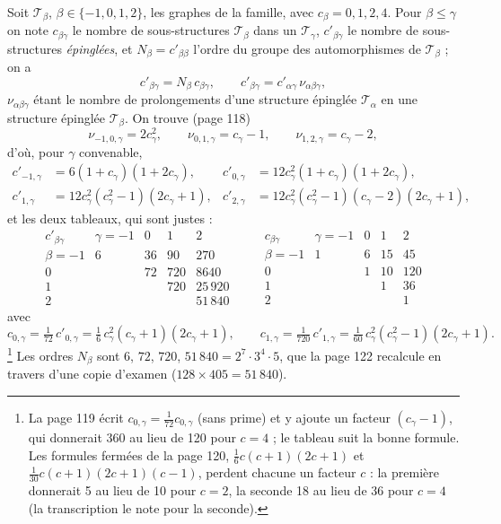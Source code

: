 \documentclass[11pt,a4paper]{article}
\begin{document}
Soit $\mathcal{T}_\beta$, $\beta \in \lbrace -1, 0, 1, 2\rbrace$, les graphes de la
famille, avec $c_\beta = 0, 1, 2, 4$. Pour $\beta \leq \gamma$ on note
$c_{\beta\gamma}$ le nombre de sous-structures $\mathcal{T}_\beta$ dans un
$\mathcal{T}_\gamma$, $c'_{\beta\gamma}$ le nombre de sous-structures
\emph{épinglées}, et $N_\beta = c'_{\beta\beta}$ l'ordre du groupe des
automorphismes de $\mathcal{T}_\beta$ ; on a
\[
c'_{\beta\gamma} = N_\beta\, c_{\beta\gamma}, \qquad c'_{\beta\gamma} =
c'_{\alpha\gamma}\, \nu_{\alpha\beta\gamma},
\]
$\nu_{\alpha\beta\gamma}$ étant le nombre de prolongements d'une structure
épinglée $\mathcal{T}_\alpha$ en une structure épinglée $\mathcal{T}_\beta$.
On trouve (page 118)
\[
\nu_{-1,0,\gamma} = 2c_\gamma^2, \qquad \nu_{0,1,\gamma} = c_\gamma - 1, \qquad
\nu_{1,2,\gamma} = c_\gamma - 2,
\]
d'où, pour $\gamma$ convenable,
\[
\begin{aligned}
c'_{-1,\gamma} &= 6(1+c_\gamma)(1+2c_\gamma), &
c'_{0,\gamma} &= 12c_\gamma^2(1+c_\gamma)(1+2c_\gamma), \\
c'_{1,\gamma} &= 12c_\gamma^2(c_\gamma^2-1)(2c_\gamma+1), &
c'_{2,\gamma} &= 12c_\gamma^2(c_\gamma^2-1)(c_\gamma-2)(2c_\gamma+1),
\end{aligned}
\]
et les deux tableaux, qui sont justes :
\[
\begin{array}{c|cccc}
c'_{\beta\gamma} & \gamma = -1 & 0 & 1 & 2 \\ \hline
\beta = -1 & 6 & 36 & 90 & 270 \\
0 & & 72 & 720 & 8640 \\
1 & & & 720 & 25\,920 \\
2 & & & & 51\,840
\end{array}
\qquad
\begin{array}{c|cccc}
c_{\beta\gamma} & \gamma = -1 & 0 & 1 & 2 \\ \hline
\beta = -1 & 1 & 6 & 15 & 45 \\
0 & & 1 & 10 & 120 \\
1 & & & 1 & 36 \\
2 & & & & 1
\end{array}
\]
avec
\[
c_{0,\gamma} = \tfrac{1}{72}\,c'_{0,\gamma} = \tfrac16\, c_\gamma^2 (c_\gamma+1)
(2c_\gamma+1), \qquad c_{1,\gamma} = \tfrac{1}{720}\, c'_{1,\gamma} =
\tfrac{1}{60}\, c_\gamma^2 (c_\gamma^2 - 1)(2c_\gamma+1) .
\]\footnote{La page 119
écrit $c_{0,\gamma} = \frac{1}{72} c_{0,\gamma}$ (sans prime) et y ajoute un
facteur $(c_\gamma - 1)$, qui donnerait 360 au lieu de 120 pour $c = 4$ ; le
tableau suit la bonne formule. Les formules fermées de la page 120,
$\frac16 c(c+1)(2c+1)$ et $\frac{1}{30}c(c+1)(2c+1)(c-1)$, perdent chacune un
facteur $c$ : la première donnerait 5 au lieu de 10 pour $c = 2$, la seconde 18
au lieu de 36 pour $c = 4$ (la transcription le note pour la seconde).}
Les ordres $N_\beta$ sont $6$, $72$, $720$, $51\,840 = 2^7 \cdot 3^4 \cdot 5$,
que la page 122 recalcule en travers d'une copie d'examen ($128 \times 405 =
51\,840$).
\end{document}

